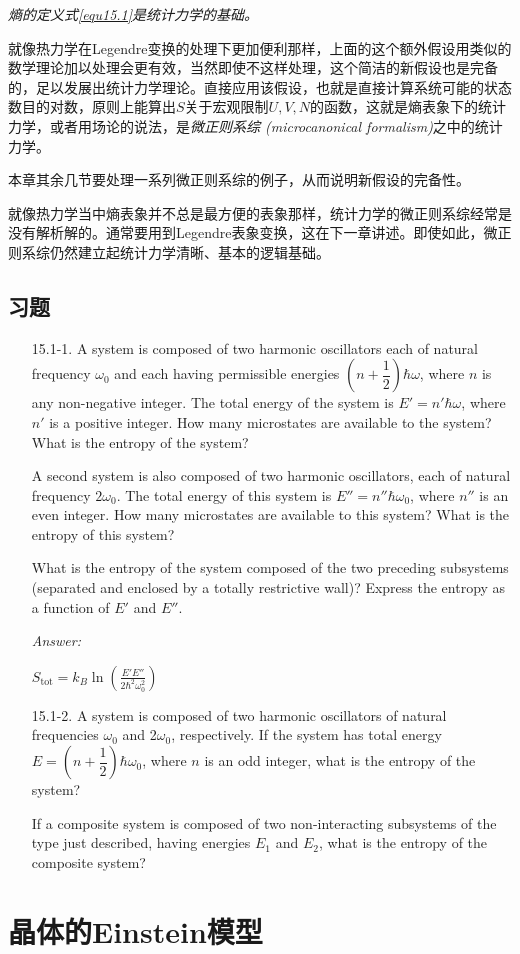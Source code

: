 {\it 熵的定义式\eqref{equ15.1}是统计力学的基础。}

就像热力学在Legendre变换的处理下更加便利那样，上面的这个额外假设用类似的数学理论加以处理会更有效，当然即使不这样处理，这个简洁的新假设也是完备的，足以发展出统计力学理论。直接应用该假设，也就是直接计算系统可能的状态数目的对数，原则上能算出$S$关于宏观限制$U, V, N$的函数，这就是熵表象下的统计力学，或者用场论的说法，是{\it 微正则系综 (microcanonical formalism)}之中的统计力学。 

本章其余几节要处理一系列微正则系综的例子，从而说明新假设的完备性。

就像热力学当中熵表象并不总是最方便的表象那样，统计力学的微正则系综经常是没有解析解的。通常要用到Legendre表象变换，这在下一章讲述。即使如此，微正则系综仍然建立起统计力学清晰、基本的逻辑基础。

\subsection*{习题}
\begin{itemize}
\item[15.1-1.] A system is composed of two harmonic oscillators each of natural frequency $\omega_0$ and each having permissible energies $(n + \dfrac{1}{2}) \hbar \omega$, where $n$ is any non-negative integer. The total energy of the system is $E' = n' \hbar \omega$, where $n'$ is a
positive integer. How many microstates are available to the system? What is the entropy of the system?

A second system is also composed of two harmonic oscillators, each of natural frequency $2\omega_0$. The total energy of this system is $E'' = n'' \hbar \omega_0$, where $n''$ is an even integer. How many microstates are available to this system? What is the entropy of this system? 

What is the entropy of the system composed of the two preceding subsystems (separated and enclosed by a totally restrictive wall)? Express the entropy as a function of $E'$ and $E''$.

\begin{flushright}
{\it Answer:}

${\displaystyle S_{\text{tot}} = k_B \ln \left( \frac{E' E''}{2\hbar^2 \omega_0^2} \right) }$
\end{flushright}

\item[15.1-2.] A system is composed of two harmonic oscillators of natural frequencies $\omega_0$ and 2$\omega_0$, respectively. If the system has total energy $E = (n + \dfrac{1}{2}) \hbar \omega_0$, where $n$ is an odd integer, what is the entropy of the system?

If a composite system is composed of two non-interacting subsystems of the type just described, having energies $E_1$ and $E_2$, what is the entropy of the composite system?
\end{itemize}


\section{晶体的Einstein模型}
\label{sec15.2}

